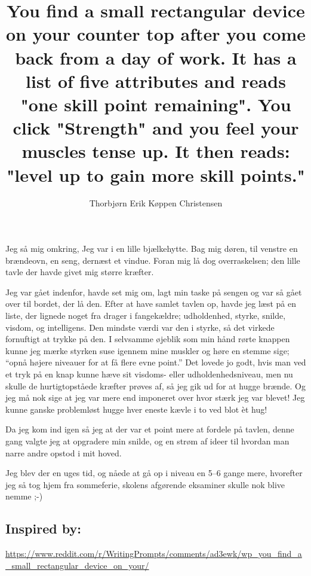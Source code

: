 \documentclass[oneside,danish,onecolumn,openbib,a4paper]{memoir}
\title{You find a small rectangular device on your counter top after you come back from a day of work. It has a list of five attributes and reads "one skill point remaining". You click "Strength" and you feel your muscles tense up. It then reads: "level up to gain more skill points."}
\author{Thorbjørn Erik Køppen Christensen}
\begin{document}
\maketitle{}

Jeg så mig omkring, Jeg var i en lille bjælkehytte. Bag mig døren, til venstre en brændeovn, en seng, dernæst et vindue. Foran mig lå dog overraskelsen; den lille tavle der havde givet mig større kræfter.

Jeg var gået indenfor, havde set mig om, lagt min taske på sengen og var så gået over til bordet, der lå den.
Efter at have samlet tavlen op, havde jeg læst på en liste, der lignede noget fra drager i fangekældre; udholdenhed, styrke, snilde, visdom, og intelligens. 
Den mindste værdi var den i styrke, så det virkede fornuftigt at trykke på den. 
I selvsamme øjeblik som min hånd rørte knappen kunne jeg mærke styrken suse igennem mine muskler og høre en stemme sige; ``opnå højere niveauer for at få flere evne point.''
Det lovede jo godt, hvis man ved et tryk på en knap kunne hæve sit visdoms- eller udholdenhedsniveau, men nu skulle de hurtigtopståede kræfter prøves af, så jeg gik ud for at hugge brænde.
Og jeg må nok sige at jeg var mere end imponeret over hvor stærk jeg var blevet! 
Jeg kunne ganske problemløst hugge hver eneste kævle i to ved blot èt hug!

Da jeg kom ind igen så jeg at der var et point mere at fordele på tavlen, denne gang valgte jeg at opgradere min snilde, og en strøm af ideer til hvordan man narre andre opstod i mit hoved.

Jeg blev der en uges tid, og nåede at gå op i niveau en 5--6 gange mere, hvorefter jeg så tog hjem fra sommeferie, skolens afgørende eksaminer skulle nok blive nemme ;-)
\newline\newline\newline
\subsection{Inspired by:}
\url{https://www.reddit.com/r/WritingPrompts/comments/ad3ewk/wp_you_find_a_small_rectangular_device_on_your/}
\end{document}
